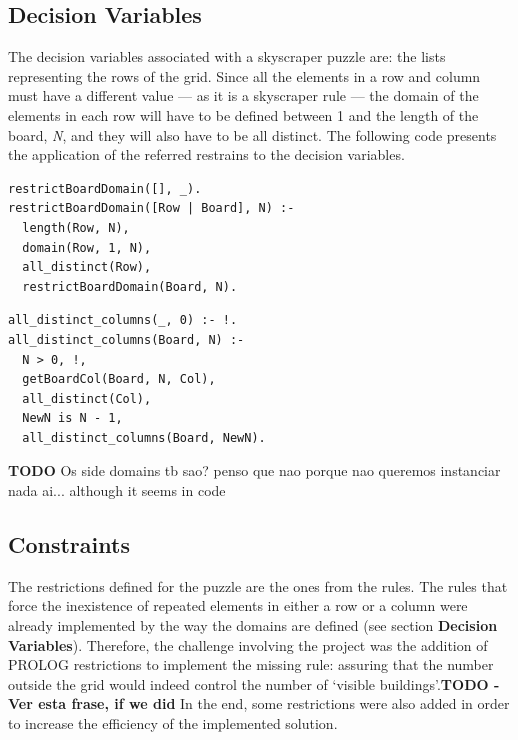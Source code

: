 \documentclass{llncs}
\begin{document}
%
\subsection{Decision Variables}

The decision variables associated with a skyscraper puzzle are: the lists representing the rows of the grid. Since all the elements in a row and column must have a different value --- as it is a skyscraper rule --- the domain of the elements in each row will have to be defined between 1 and the length of the board, \textit{N}, and they will also have to be all distinct. The following code presents the application of the referred restrains to the decision variables.\\

\noindent\begin{minipage}{.44\textwidth}
\begin{lstlisting}[frame= tblr, caption=Row domain restrictions]
restrictBoardDomain([], _).
restrictBoardDomain([Row | Board], N) :-
  length(Row, N),
  domain(Row, 1, N),
  all_distinct(Row),
  restrictBoardDomain(Board, N).
\end{lstlisting}
\end{minipage}\hfill
\begin{minipage}{.5\textwidth}
\begin{lstlisting}[frame=tblr, caption=Column all elements distinct]
all_distinct_columns(_, 0) :- !.
all_distinct_columns(Board, N) :-
  N > 0, !,
  getBoardCol(Board, N, Col),
  all_distinct(Col),
  NewN is N - 1,
  all_distinct_columns(Board, NewN).
\end{lstlisting}
\end{minipage}\hfill

\textbf{TODO} Os side domains tb sao? penso que nao porque nao queremos instanciar nada ai... although it seems in code

%
\subsection{Constraints}

The restrictions defined for the puzzle are the ones from the rules. The rules that force the inexistence of repeated elements in either a row or a column were already implemented by the way the domains are defined (see section \textbf{Decision Variables}). Therefore, the challenge involving the project was the addition of PROLOG restrictions to implement the missing rule: assuring that the number outside the grid would indeed control the number of `visible buildings'.\textbf{TODO - Ver esta frase, if we did} In the end, some restrictions were also added in order to increase the efficiency of the implemented solution.\\
\end{document}
